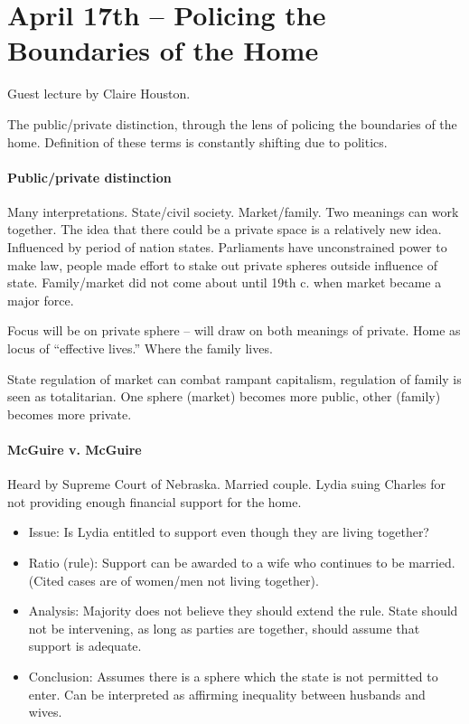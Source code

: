 \section{April 17th -- Policing the Boundaries of the Home}

Guest lecture by Claire Houston.

The public/private distinction, through the lens of policing the boundaries of the home. Definition of these terms is constantly shifting due to politics.

\paragraph{Public/private distinction} Many interpretations. State/civil society. Market/family. Two meanings can work together. The idea that there could be a private space is a relatively new idea. Influenced by period of nation states. Parliaments have unconstrained power to make law, people made effort to stake out private spheres outside influence of state. Family/market did not come about until 19th c. when market became a major force.

Focus will be on private sphere -- will draw on both meanings of private. Home as locus of ``effective lives.'' Where the family lives.

State regulation of market can combat rampant capitalism, regulation of family is seen as totalitarian. One sphere (market) becomes more public, other (family) becomes more private.

\paragraph{McGuire v. McGuire} Heard by Supreme Court of Nebraska. Married couple. Lydia suing Charles for not providing enough financial support for the home.

\begin{itemize}
	\item Issue: Is Lydia entitled to support even though they are living together?
	\item Ratio (rule): Support can be awarded to a wife who continues to be married. (Cited cases are of women/men not living together).
	\item Analysis: Majority does not believe they should extend the rule. State should not be intervening, as long as parties are together, should assume that support is adequate.
	\item Conclusion: Assumes there is a sphere which the state is not permitted to enter. Can be interpreted as affirming inequality between husbands and wives. 
\end{itemize}

